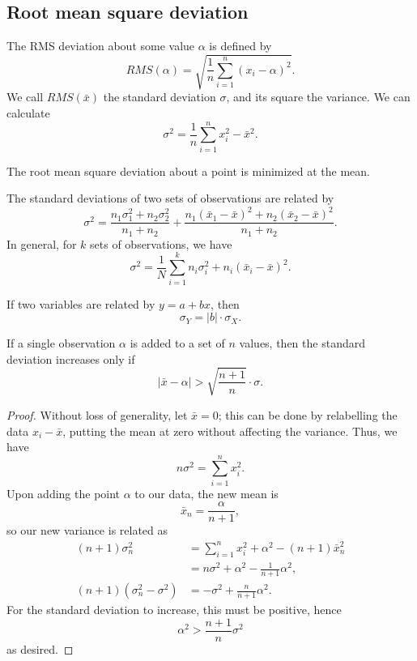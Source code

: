 \documentclass[11pt]{article}
\theoremstyle{definition}
\theoremstyle{remark}
\numberwithin{equation}{section}
\begin{document}
    \subsection{Root mean square deviation}
    
    The RMS deviation about some value $\alpha$ is defined by \[
        RMS(\alpha) = \sqrt{\frac{1}{n} \sum_{i = 1}^n (x_i - \alpha)^2}.
    \] We call $RMS(\bar{x})$ the standard deviation $\sigma$, and its square the
    variance. We can calculate \[
        \sigma^2 = \frac{1}{n} \sum_{i = 1}^n x_i^2 - \bar{x}^2.
    \] 

    \begin{theorem}
        The root mean square deviation about a point is minimized at the mean.
    \end{theorem}

    \begin{theorem}
        The standard deviations of two sets of observations are related by \[
            \sigma^2 = \frac{n_1\sigma_1^2 + n_2\sigma_2^2}{n_1 + n_2} +
            \frac{n_1(\bar{x}_1 - \bar{x})^2 + n_2(\bar{x}_2 - \bar{x})^2}{n_1 +
            n_2}.
        \] In general, for $k$ sets of observations, we have \[
            \sigma^2 = \frac{1}{N}\sum_{i = 1}^k n_i\sigma_i^2 + n_i(\bar{x}_i -
            \bar{x})^2.
        \] 
    \end{theorem}

    \begin{theorem}
        If two variables are related by $y = a + bx$, then \[
            \sigma_Y = |b|\cdot \sigma_X.
        \] 
    \end{theorem}

    \begin{exercise}
        If a single observation $\alpha$ is added to a set of $n$ values, then the
        standard deviation increases only if \[
            |\bar{x} - \alpha| > \sqrt{\frac{n + 1}{n}}\cdot \sigma.
        \] 
    \end{exercise}
    \begin{proof}
        Without loss of generality, let $\bar{x} = 0$; this can be done by
        relabelling the data $x_i - \bar{x}$, putting the mean at zero without
        affecting the variance. Thus, we have \[
            n\sigma^2 = \sum_{i = 1}^n x_i^2.
        \] Upon adding the point $\alpha$ to our data, the new mean is \[
            \bar{x}_n = \frac{\alpha}{n + 1},
        \] so our new variance is related as \begin{align*}
            (n + 1)\sigma_n^2 &= \sum_{i = 1}^n x_i^2 + \alpha^2 - (n + 1)\bar{x}_n^2 \\
                &= n\sigma^2 + \alpha^2 - \frac{1}{n + 1}\alpha^2, \\
            (n + 1)(\sigma_n^2 - \sigma^2) &= -\sigma^2 + \frac{n}{n + 1}\alpha^2.
        \end{align*}
        For the standard deviation to increase, this must be positive, hence \[
            \alpha^2 > \frac{n + 1}{n}\sigma^2
        \] as desired.
    \end{proof}
\end{document}
